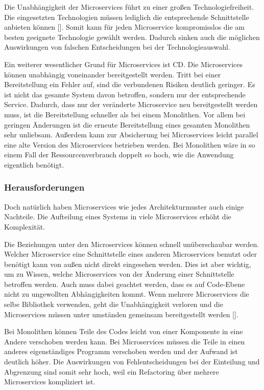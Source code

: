 Die Unabhängigkeit der Microservices führt zu einer großen Technologiefreiheit. Die eingesetzten Technologien müssen lediglich die entsprechende Schnittstelle anbieten können [\cite[S. 5]{wolffMicroservices2018}]. Somit kann für jeden Microservice kompromisslos die am besten geeignete Technologie gewählt werden. Dadurch sinken auch die möglichen Auswirkungen von falschen Entscheidungen bei der Technologieauswahl.

Ein weiterer wesentlicher Grund für Microservices ist \ac{CD}. Die Microservices können unabhängig voneinander bereitgestellt werden. Tritt bei einer Bereitstellung ein Fehler auf, sind die verbundenen Risiken deutlich geringer. Es ist nicht das gesamte System davon betroffen, sondern nur der entsprechende Service. Dadurch, dass nur der veränderte Microservice neu bereitgestellt werden muss, ist die Bereitstellung schneller als bei einem Monolithen. Vor allem bei geringen Änderungen ist die erneute Bereitstellung eines gesamten Monolithen sehr unliebsam. Außerdem kann zur Absicherung bei Microservices leicht parallel eine alte Version des Microservices betrieben werden. Bei Monolithen wäre in so einem Fall der Ressourcenverbrauch doppelt so hoch, wie die Anwendung eigentlich benötigt.

\subsubsection{Herausforderungen}

Doch natürlich haben Microservices wie jedes Architekturmuster auch einige Nachteile. Die Aufteilung eines Systems in viele Microservices erhöht die Komplexität. 

Die Beziehungen unter den Microservices können schnell unüberschaubar werden. Welcher Microservice eine Schnittstelle eines anderen Microservices benutzt oder benötigt kann von außen nicht direkt eingesehen werden. Dies ist aber wichtig, um zu Wissen, welche Microservices von der Änderung einer Schnittstelle betroffen werden. Auch muss dabei geachtet werden, dass es auf Code-Ebene nicht zu ungewollten Abhängigkeiten kommt. Wenn mehrere Microservices die selbe Bibliothek verwenden, geht die Unabhängigkeit verloren und die Microservices müssen unter umständen gemeinsam bereitgestellt werden [\cite[S. 75]{wolffMicroservices2018}].

Bei Monolithen können Teile des Codes leicht von einer Komponente in eine Andere verschoben werden kann. Bei Microservices müssen die Teile in einen anderes eigenständiges Programm verschoben werden und der Aufwand ist deutlich höher. Die Auswirkungen von Fehlentscheidungen bei der Einteilung und Abgrenzung sind somit sehr hoch, weil ein Refactoring über mehrere Microservices kompliziert ist.

